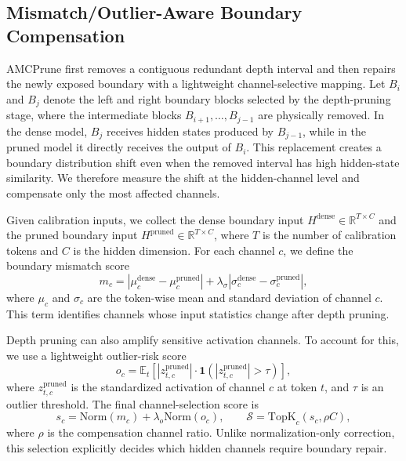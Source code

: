 \subsection{Mismatch/Outlier-Aware Boundary Compensation}
\label{sec:method_boundary_comp}

AMCPrune first removes a contiguous redundant depth interval and then repairs the newly exposed boundary with a lightweight channel-selective mapping. Let $B_i$ and $B_j$ denote the left and right boundary blocks selected by the depth-pruning stage, where the intermediate blocks $B_{i+1},\ldots,B_{j-1}$ are physically removed. In the dense model, $B_j$ receives hidden states produced by $B_{j-1}$, while in the pruned model it directly receives the output of $B_i$. This replacement creates a boundary distribution shift even when the removed interval has high hidden-state similarity. We therefore measure the shift at the hidden-channel level and compensate only the most affected channels.

Given calibration inputs, we collect the dense boundary input $H^{\mathrm{dense}}\in\mathbb{R}^{T\times C}$ and the pruned boundary input $H^{\mathrm{pruned}}\in\mathbb{R}^{T\times C}$, where $T$ is the number of calibration tokens and $C$ is the hidden dimension. For each channel $c$, we define the boundary mismatch score
\begin{equation}
m_c =
\left|\mu_c^{\mathrm{dense}}-\mu_c^{\mathrm{pruned}}\right|
+ \lambda_{\sigma}
\left|\sigma_c^{\mathrm{dense}}-\sigma_c^{\mathrm{pruned}}\right|,
\end{equation}
where $\mu_c$ and $\sigma_c$ are the token-wise mean and standard deviation of channel $c$. This term identifies channels whose input statistics change after depth pruning.

Depth pruning can also amplify sensitive activation channels. To account for this, we use a lightweight outlier-risk score
\begin{equation}
o_c =
\mathbb{E}_{t}\left[
|z_{t,c}^{\mathrm{pruned}}|
\cdot
\mathbf{1}\left(|z_{t,c}^{\mathrm{pruned}}|>\tau\right)
\right],
\end{equation}
where $z_{t,c}^{\mathrm{pruned}}$ is the standardized activation of channel $c$ at token $t$, and $\tau$ is an outlier threshold. The final channel-selection score is
\begin{equation}
s_c =
\mathrm{Norm}(m_c)
+ \lambda_o \mathrm{Norm}(o_c),
\qquad
\mathcal{S}=\mathrm{TopK}_{c}(s_c,\rho C),
\end{equation}
where $\rho$ is the compensation channel ratio. Unlike normalization-only correction, this selection explicitly decides which hidden channels require boundary repair.

